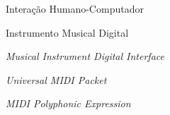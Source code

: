 \begin{siglas}

\item [IHC]
\begin{acronym}[ABNT]
Interação Humano-Computador
\end{acronym}

\item [IMD]
\begin{acronym}[ABNT]
Instrumento Musical Digital
\end{acronym}

\item [MIDI]
\begin{acronym}[ABNT]
\textit{Musical Instrument Digital Interface}
\end{acronym}

\item [UMP]
\begin{acronym}[ABNT]
\textit{Universal MIDI Packet}
\end{acronym}

\item [MPE]
\begin{acronym}[ABNT]
\textit{MIDI Polyphonic Expression}
\end{acronym}

\end{siglas}
